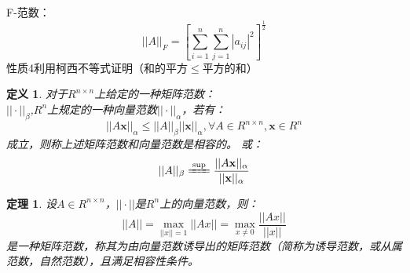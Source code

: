 \documentclass[a4paper]{article}
\newtheorem{definition}{定义}[section]
\newtheorem{theorem}{定理}[section]
\begin{document}
F-范数：
$$||A||_F=[\sum^n_{i=1}\sum^n_{j=1}|a_{ij}|^2]^\frac{1}{2}$$
性质4利用柯西不等式证明（和的平方$\le$平方的和）

\begin{definition}
对于$R^{n\times n}$上给定的一种矩阵范数：\\
$||\cdot||_{\beta}$,$R^n$上规定的一种向量范数$||\cdot||_\alpha $，若有：
\begin{equation}
||A\mathbf{x} ||_\alpha \le ||A||_\beta ||\mathbf{x} ||_\alpha, \forall A \in R^{n\times n}, \mathbf{x} \in R^{n}
\end{equation}
成立，则称上述矩阵范数和向量范数是相容的。
或：
\begin{equation}
||A||_\beta \xlongequal[]{\sup} \frac{||A\mathbf{x} ||_\alpha}{||\mathbf{x}||_\alpha}
\end{equation}
\end{definition}

\begin{theorem}
设$A\in R^{n\times n}$，$||\cdot||$是$R^n$上的向量范数，则：
\begin{equation}
||A||=\max_{||x||=1}||Ax||=\max_{x \neq 0}\frac{||Ax||}{||x||}
\label{eq_natnorm}
\end{equation}
是一种矩阵范数，称其为由向量范数诱导出的矩阵范数（简称为诱导范数，或从属范数，自然范数），且满足相容性条件。
\label{theorem_natnorm}
\end{theorem}
\end{document}
